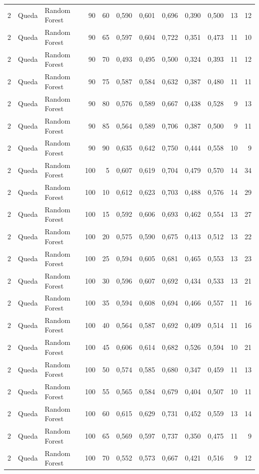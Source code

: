 \begin{longtable}{@{}rllrrrrrrrrr@{}}
2 & Queda & Random Forest & 90 & 60 & 0,590 & 0,601 & 0,696 & 0,390 & 0,500 & 13 & 12 \\
2 & Queda & Random Forest & 90 & 65 & 0,597 & 0,604 & 0,722 & 0,351 & 0,473 & 11 & 10 \\
2 & Queda & Random Forest & 90 & 70 & 0,493 & 0,495 & 0,500 & 0,324 & 0,393 & 11 & 12 \\
2 & Queda & Random Forest & 90 & 75 & 0,587 & 0,584 & 0,632 & 0,387 & 0,480 & 11 & 11 \\
2 & Queda & Random Forest & 90 & 80 & 0,576 & 0,589 & 0,667 & 0,438 & 0,528 & 9 & 13 \\
2 & Queda & Random Forest & 90 & 85 & 0,564 & 0,589 & 0,706 & 0,387 & 0,500 & 9 & 11 \\
2 & Queda & Random Forest & 90 & 90 & 0,635 & 0,642 & 0,750 & 0,444 & 0,558 & 10 & 9 \\
2 & Queda & Random Forest & 100 & 5 & 0,607 & 0,619 & 0,704 & 0,479 & 0,570 & 14 & 34 \\
2 & Queda & Random Forest & 100 & 10 & 0,612 & 0,623 & 0,703 & 0,488 & 0,576 & 14 & 29 \\
2 & Queda & Random Forest & 100 & 15 & 0,592 & 0,606 & 0,693 & 0,462 & 0,554 & 13 & 27 \\
2 & Queda & Random Forest & 100 & 20 & 0,575 & 0,590 & 0,675 & 0,413 & 0,512 & 13 & 22 \\
2 & Queda & Random Forest & 100 & 25 & 0,594 & 0,605 & 0,681 & 0,465 & 0,553 & 13 & 23 \\
2 & Queda & Random Forest & 100 & 30 & 0,596 & 0,607 & 0,692 & 0,434 & 0,533 & 13 & 21 \\
2 & Queda & Random Forest & 100 & 35 & 0,594 & 0,608 & 0,694 & 0,466 & 0,557 & 11 & 16 \\
2 & Queda & Random Forest & 100 & 40 & 0,564 & 0,587 & 0,692 & 0,409 & 0,514 & 11 & 16 \\
2 & Queda & Random Forest & 100 & 45 & 0,606 & 0,614 & 0,682 & 0,526 & 0,594 & 10 & 21 \\
2 & Queda & Random Forest & 100 & 50 & 0,574 & 0,585 & 0,680 & 0,347 & 0,459 & 11 & 13 \\
2 & Queda & Random Forest & 100 & 55 & 0,565 & 0,584 & 0,679 & 0,404 & 0,507 & 10 & 11 \\
2 & Queda & Random Forest & 100 & 60 & 0,615 & 0,629 & 0,731 & 0,452 & 0,559 & 13 & 14 \\
2 & Queda & Random Forest & 100 & 65 & 0,569 & 0,597 & 0,737 & 0,350 & 0,475 & 11 & 9 \\
2 & Queda & Random Forest & 100 & 70 & 0,552 & 0,573 & 0,667 & 0,421 & 0,516 & 9 & 12 \\

\end{longtable}
